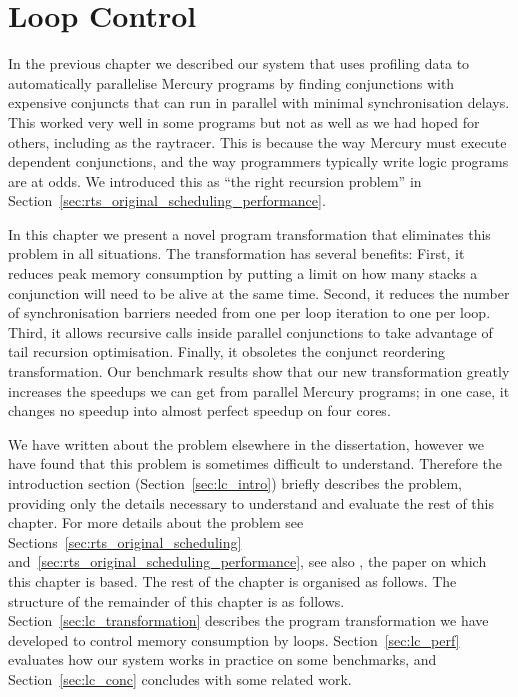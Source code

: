 
\chapter{Loop Control}
\label{chap:lc}
\label{chap:loop_control}


In the previous chapter we described our
system that uses profiling data
to automatically parallelise Mercury programs by
finding conjunctions with expensive conjuncts
that can run in parallel with minimal synchronisation delays.
This worked very well in some programs but not as well as we had hoped for
others,
including as the raytracer.
This is because the way Mercury must execute dependent conjunctions,
and the way programmers typically write logic programs are at odds.
We introduced this as
``the right recursion problem''
in Section~\ref{sec:rts_original_scheduling_performance}.

In this chapter we present a novel program transformation that eliminates
this problem in all situations.
The transformation has several benefits:
First, it reduces peak memory consumption
by putting a limit on how many stacks
a conjunction will need to be alive at the same time.
Second,
it reduces the number of synchronisation barriers needed
from one per loop iteration to one per loop.
Third, it allows recursive calls inside parallel conjunctions to take
advantage of tail recursion optimisation.
Finally, it obsoletes the conjunct reordering transformation.
Our benchmark results show that our new transformation
greatly increases the speedups we can get from parallel Mercury programs;
in one case, it changes no speedup into almost perfect speedup on four cores.

We have written about the problem elsewhere in the dissertation,
however we have found that this problem is sometimes difficult to
understand.
Therefore
the introduction section
(Section~\ref{sec:lc_intro})
briefly describes the problem,
providing only the details necessary to understand and evaluate the rest of
this chapter.
For more details about the problem see
Sections~\ref{sec:rts_original_scheduling}
and~\ref{sec:rts_original_scheduling_performance},
see also \citet{bone:2012:loop_control}, the paper on which this chapter is
based.
The rest of the chapter is organised as follows.
The structure of the remainder of this chapter is as follows.
Section~\ref{sec:lc_transformation} describes
the program transformation we have developed
to control memory consumption by loops.
Section~\ref{sec:lc_perf} evaluates
how our system works in practice on some benchmarks,
and
Section~\ref{sec:lc_conc} concludes with some related work.

